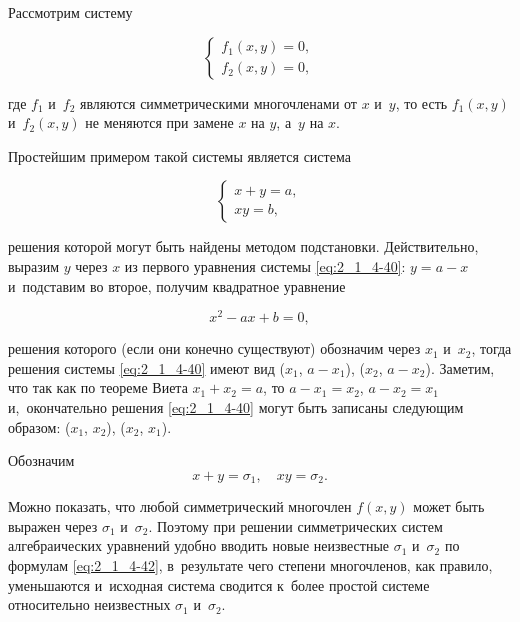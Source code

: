
Рассмотрим систему

\begin{equation}\label{eq:2_1_4-39}
\begin{cases}
f_{1}(x, y) = 0, \\
f_{2}(x, y) = 0,
\end{cases}
\end{equation}

\noindent
где $f_{1}$ и~$f_{2}$ являются симметрическими многочленами от $x$ и~$y$,
то есть $f_{1}(x, y)$ и~$f_{2}(x, y)$ не меняются при замене $x$ на $y$,
а~$y$ на $x$.

Простейшим примером такой системы является система 

\begin{equation}\label{eq:2_1_4-40}
\begin{cases}
x + y = a, \\
xy = b,
\end{cases}
\end{equation}

\noindent
решения которой могут быть найдены методом подстановки.
Действительно, выразим $y$ через $x$ из первого уравнения системы \eqref{eq:2_1_4-40}:
$y = a - x$ и~подставим во второе, получим квадратное уравнение

\begin{equation}\label{eq:2_1_4-41}
x^{2} - ax + b = 0,
\end{equation}

\noindent
решения которого (если они конечно существуют) обозначим через $x_{1}$ и~$x_{2}$,
тогда решения системы \eqref{eq:2_1_4-40} имеют вид
($x_{1}$, $a - x_{1}$), ($x_{2}$, $a - x_{2}$).
Заметим, что так как по теореме Виета $x_{1} + x_{2} = a$, то $a - x_{1} = x_{2}$,
$a - x_{2} = x_{1}$ и,~окончательно решения \eqref{eq:2_1_4-40} могут быть записаны
следующим образом: ($x_{1}$, $x_{2}$), ($x_{2}$, $x_{1}$).

Обозначим
\begin{equation}\label{eq:2_1_4-42}
x + y = \sigma_{1}, \quad xy = \sigma_{2}. 
\end{equation}

Можно показать, что любой симметрический многочлен $f(x, y)$ может быть выражен
через $\sigma_{1}$ и~$\sigma_{2}$. Поэтому при решении симметрических систем
алгебраических уравнений удобно вводить новые неизвестные $\sigma_{1}$ и~$\sigma_{2}$
по формулам \eqref{eq:2_1_4-42}, в~результате чего степени многочленов, как правило,
уменьшаются и~исходная система сводится к~более простой системе относительно неизвестных
$\sigma_{1}$ и~$\sigma_{2}$. 

